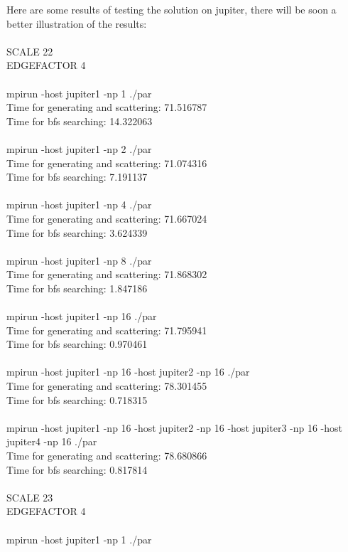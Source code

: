 \documentclass[12pt,a4paper]{article}
\begin{document}
Here are some results of testing the solution on jupiter, there will be soon a better illustration of the results: \\
\\
SCALE 22\\
EDGEFACTOR 4\\
\\
mpirun -host jupiter1 -np 1 ./par\\
Time for generating and scattering: 71.516787\\
Time for bfs searching: 14.322063\\
\\
mpirun -host jupiter1 -np 2 ./par\\
Time for generating and scattering: 71.074316\\
Time for bfs searching: 7.191137\\
\\
mpirun -host jupiter1 -np 4 ./par\\
Time for generating and scattering: 71.667024\\
Time for bfs searching: 3.624339\\
\\
mpirun -host jupiter1 -np 8 ./par\\
Time for generating and scattering: 71.868302\\
Time for bfs searching: 1.847186\\
\\
mpirun -host jupiter1 -np 16 ./par\\
Time for generating and scattering: 71.795941\\
Time for bfs searching: 0.970461\\
\\
mpirun -host jupiter1 -np 16 -host jupiter2 -np 16 ./par\\
Time for generating and scattering: 78.301455\\
Time for bfs searching: 0.718315\\
\\
mpirun -host jupiter1 -np 16 -host jupiter2 -np 16 -host jupiter3 -np 16 -host jupiter4 -np 16 ./par\\
Time for generating and scattering: 78.680866\\
Time for bfs searching: 0.817814\\
\\
SCALE 23\\
EDGEFACTOR 4\\
\\
mpirun -host jupiter1 -np 1 ./par\\
\end{document}

